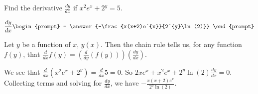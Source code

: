 \documentclass{ximera}
\author{Gregory Hartman \and Matthew Carr}
\begin{document}
\begin{exercise}




Find the derivative $\frac{dy}{dx}$ if $x^2e^{x}+2^y=5$.

\[
\frac{dy}{dx}
\begin{prompt}
= \answer{-\frac{x(x+2)e^{x}}{2^{y}\ln(2)}}
\end{prompt}
\]

\begin{hint}
Let $y$ be a function of $x$, $y(x)$. Then the chain rule tells us, for any function $f(y)$, that $\frac{d}{dx}f(y)=\left(\frac{d}{dy}\left(f(y)\right)\right)\left(\frac{dy}{dx}\right)$. 
\end{hint}
\begin{hint}
We see that $\frac{d}{dx}(x^2e^x+2^y)=\frac{d}{dx}5=0$. So $2xe^x+x^2e^x+2^y\ln(2)\frac{dy}{dx}=0$. Collecting terms and solving for $\frac{dy}{dx}$, we have $-\frac{x(x+2)e^x}{2^{y}\ln(2)}$.
\end{hint}

\end{exercise}
\end{document}
